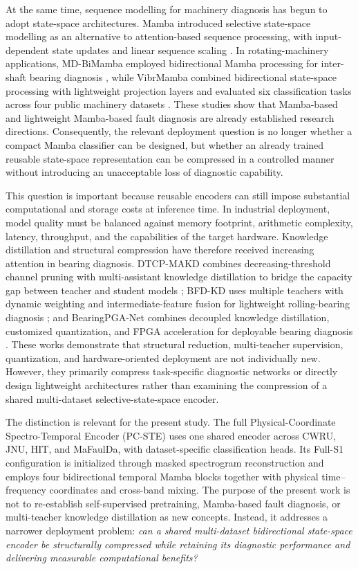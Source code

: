 At the same time, sequence modelling for machinery diagnosis has begun to adopt state-space architectures. Mamba introduced selective state-space modelling as an alternative to attention-based sequence processing, with input-dependent state updates and linear sequence scaling \citep{Gu2023Mamba}. In rotating-machinery applications, MD-BiMamba employed bidirectional Mamba processing for inter-shaft bearing diagnosis \citep{Wang2025MDBiMamba}, while VibrMamba combined bidirectional state-space processing with lightweight projection layers and evaluated six classification tasks across four public machinery datasets \citep{Yi2025VibrMamba}. These studies show that Mamba-based and lightweight Mamba-based fault diagnosis are already established research directions. Consequently, the relevant deployment question is no longer whether a compact Mamba classifier can be designed, but whether an already trained reusable state-space representation can be compressed in a controlled manner without introducing an unacceptable loss of diagnostic capability.

This question is important because reusable encoders can still impose substantial computational and storage costs at inference time. In industrial deployment, model quality must be balanced against memory footprint, arithmetic complexity, latency, throughput, and the capabilities of the target hardware. Knowledge distillation and structural compression have therefore received increasing attention in bearing diagnosis. DTCP-MAKD combines decreasing-threshold channel pruning with multi-assistant knowledge distillation to bridge the capacity gap between teacher and student models \citep{Zhong2024DTCPMAKD}; BFD-KD uses multiple teachers with dynamic weighting and intermediate-feature fusion for lightweight rolling-bearing diagnosis \citep{Sun2026BFDKD}; and BearingPGA-Net combines decoupled knowledge distillation, customized quantization, and FPGA acceleration for deployable bearing diagnosis \citep{Liao2024BearingPGANet}. These works demonstrate that structural reduction, multi-teacher supervision, quantization, and hardware-oriented deployment are not individually new. However, they primarily compress task-specific diagnostic networks or directly design lightweight architectures rather than examining the compression of a shared multi-dataset selective-state-space encoder.

The distinction is relevant for the present study. The full Physical-Coordinate Spectro-Temporal Encoder (PC-STE) uses one shared encoder across CWRU, JNU, HIT, and MaFaulDa, with dataset-specific classification heads. Its Full-S1 configuration is initialized through masked spectrogram reconstruction and employs four bidirectional temporal Mamba blocks together with physical time--frequency coordinates and cross-band mixing. The purpose of the present work is not to re-establish self-supervised pretraining, Mamba-based fault diagnosis, or multi-teacher knowledge distillation as new concepts. Instead, it addresses a narrower deployment problem: \emph{can a shared multi-dataset bidirectional state-space encoder be structurally compressed while retaining its diagnostic performance and delivering measurable computational benefits?}

